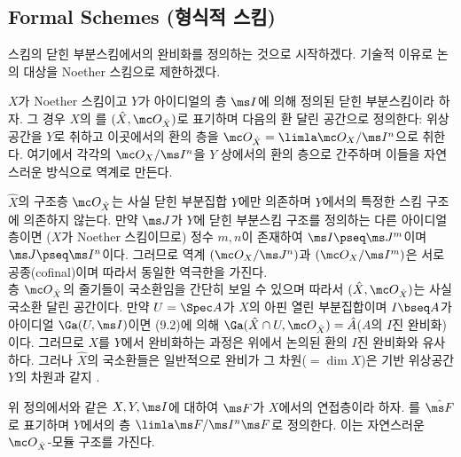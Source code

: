 	
	\subsection*{Formal Schemes (형식적 스킴)}
	
	스킴의 닫힌 부분스킴에서의 완비화를 정의하는 것으로 시작하겠다. 기술적 이유로 논의 대상을 Noether 스킴으로 제한하겠다.
	
	
	\begin{definition}
	$X$가 Noether 스킴이고 $Y$가 아이디얼의 층 $\ms I$에 의해 정의된 닫힌 부분스킴이라 하자.
	그 경우 $X$의 를 $(\hat X,\mc O_{\hat X})$로 표기하며
	다음의 환 달린 공간으로 정의한다: 위상공간을 $Y$로 취하고 이곳에서의 환의 층을 $\mc O_{\hat X}=\limla\mc O_X/\ms I^n$으로 취한다.
	여기에서 각각의 $\mc O_X/\ms I^n$을 $Y$ 상에서의 환의 층으로 간주하며 이들을 자연스러운 방식으로 역계로 만든다.
	\end{definition}
	
	
	\begin{remark}
	$\hat X$의 구조층 $\mc O_{\hat X}$는 사실 닫힌 부분집합 $Y$에만 의존하며 $Y$에서의 특정한 스킴 구조에 의존하지 않는다.
	만약 $\ms J$가 $Y$에 닫힌 부분스킴 구조를 정의하는 다른 아이디얼 층이면 ($X$가 Noether 스킴이므로)
	정수 $m,n$이 존재하여 $\ms I\pseq\ms J^m$이며 $\ms J\pseq\ms I^n$이다.
	그러므로 역계 $(\mc O_X/\ms J^n)$과 $(\mc O_X/\ms I^m)$은 서로 공종(cofinal)이며 따라서 동일한 역극한을 가진다.\\
	층 $\mc O_{\hat X}$의 줄기들이 국소환임을 간단히 보일 수 있으며 따라서 $(\hat X,\mc O_{\hat X})$는 사실 국소환 달린 공간이다.
	만약 $U=\Spec A$가 $X$의 아핀 열린 부분집합이며 $I\bseq A$가 아이디얼 $\Ga(U,\ms I)$이면
	(9.2)에 의해 $\Ga(\hat X\cap U,\mc O_{\hat X})=\hat A$($A$의 $I$진 완비화)이다.
	그러므로 $X$를 $Y$에서 완비화하는 과정은 위에서 논의된 환의 $I$진 완비화와 유사하다.
	그러나 $\hat X$의 국소환들은 일반적으로 완비가 \ti{아니며}
	그 차원($=\dim X$)은 기반 위상공간 $Y$의 차원과 같지 \ti{않다}.
	\end{remark}
	
	
	\begin{definition}
	위 정의에서와 같은 $X,Y,\ms I$에 대하여 $\ms F$가 $X$에서의 연접층이라 하자.
	를 $\hat{\ms F}$로 표기하며
	$Y$에서의 층 $\limla\ms F/\ms I^n\ms F$로 정의한다. 이는 자연스러운 $\mc O_{\hat X}$-모듈 구조를 가진다.
	\end{definition}
	
